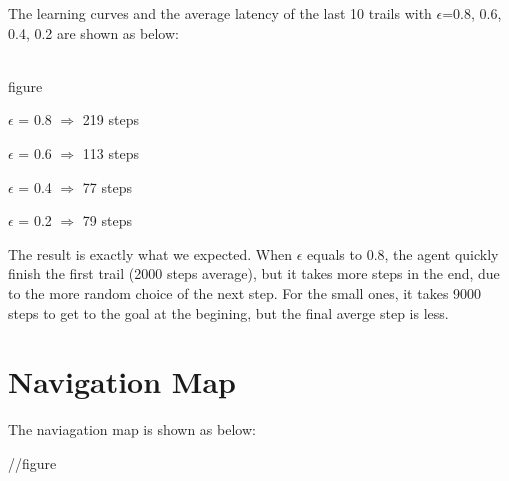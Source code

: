 \documentclass[a4paper, 12pt]{article}
\begin{document}
The learning curves and the average latency of the last 10 trails with $\epsilon$=0.8, 0.6, 0.4, 0.2 are shown as below:

\\figure

$\epsilon$ = 0.8 $\Rightarrow$ 219 steps

$\epsilon$ = 0.6 $\Rightarrow$ 113 steps

$\epsilon$ = 0.4 $\Rightarrow$ 77  steps

$\epsilon$ = 0.2 $\Rightarrow$ 79 steps

The result is exactly what we expected. When $\epsilon$ equals to 0.8, the agent quickly finish the first trail (2000 steps average), but it takes more steps in the end, due to the more random choice of the next step. For the small ones, it takes 9000 steps to get to the goal at the begining, but the final averge step is less.

\section{Navigation Map}


The naviagation map is shown as below: 

//figure
\end{document}
